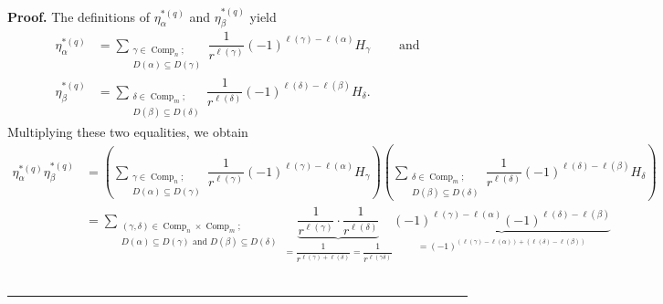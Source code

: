 \documentclass[numbers=enddot,12pt,final,onecolumn,notitlepage]{scrartcl}%
\theoremstyle{definition}
\newenvironment{proof}[1][Proof]{\noindent\textbf{#1.} }{\ \rule{0.5em}{0.5em}}
\let\sumnonlimits\sum
\renewcommand{\sum}{\sumnonlimits\limits}
\newenvironment{noncompile}{}{}
\begin{document}
\begin{proof}
\begin{noncompile}
The definitions of $\eta_{\alpha}^{\ast\left(  q\right)  }$ and $\eta_{\beta
}^{\ast\left(  q\right)  }$ yield%
\begin{align*}
\eta_{\alpha}^{\ast\left(  q\right)  }  &  =\sum_{\substack{\gamma
\in\operatorname*{Comp}\nolimits_{n};\\D\left(  \alpha\right)  \subseteq
D\left(  \gamma\right)  }}\dfrac{1}{r^{\ell\left(  \gamma\right)  }}\left(
-1\right)  ^{\ell\left(  \gamma\right)  -\ell\left(  \alpha\right)  }%
H_{\gamma}\ \ \ \ \ \ \ \ \ \ \text{and}\\
\eta_{\beta}^{\ast\left(  q\right)  }  &  =\sum_{\substack{\delta
\in\operatorname*{Comp}\nolimits_{m};\\D\left(  \beta\right)  \subseteq
D\left(  \delta\right)  }}\dfrac{1}{r^{\ell\left(  \delta\right)  }}\left(
-1\right)  ^{\ell\left(  \delta\right)  -\ell\left(  \beta\right)  }H_{\delta
}.
\end{align*}
Multiplying these two equalities, we obtain%
\begin{align}
\eta_{\alpha}^{\ast\left(  q\right)  }\eta_{\beta}^{\ast\left(  q\right)  }
&  =\left(  \sum_{\substack{\gamma\in\operatorname*{Comp}\nolimits_{n}%
;\\D\left(  \alpha\right)  \subseteq D\left(  \gamma\right)  }}\dfrac
{1}{r^{\ell\left(  \gamma\right)  }}\left(  -1\right)  ^{\ell\left(
\gamma\right)  -\ell\left(  \alpha\right)  }H_{\gamma}\right)  \left(
\sum_{\substack{\delta\in\operatorname*{Comp}\nolimits_{m};\\D\left(
\beta\right)  \subseteq D\left(  \delta\right)  }}\dfrac{1}{r^{\ell\left(
\delta\right)  }}\left(  -1\right)  ^{\ell\left(  \delta\right)  -\ell\left(
\beta\right)  }H_{\delta}\right) \nonumber\\
&  =\sum_{\substack{\left(  \gamma,\delta\right)  \in\operatorname*{Comp}%
\nolimits_{n}\times\operatorname*{Comp}\nolimits_{m};\\D\left(  \alpha\right)
\subseteq D\left(  \gamma\right)  \text{ and }D\left(  \beta\right)  \subseteq
D\left(  \delta\right)  }}\underbrace{\dfrac{1}{r^{\ell\left(  \gamma\right)
}}\cdot\dfrac{1}{r^{\ell\left(  \delta\right)  }}}_{=\dfrac{1}{r^{\ell\left(
\gamma\right)  +\ell\left(  \delta\right)  }}=\dfrac{1}{r^{\ell\left(
\gamma\delta\right)  }}}\underbrace{\left(  -1\right)  ^{\ell\left(
\gamma\right)  -\ell\left(  \alpha\right)  }\left(  -1\right)  ^{\ell\left(
\delta\right)  -\ell\left(  \beta\right)  }}_{\substack{=\left(  -1\right)
^{\left(  \ell\left(  \gamma\right)  -\ell\left(  \alpha\right)  \right)
+\left(  \ell\left(  \delta\right)  -\ell\left(  \beta\right)  \right)
}}}
\end{align}
\end{noncompile}
\end{proof}
\end{document}
